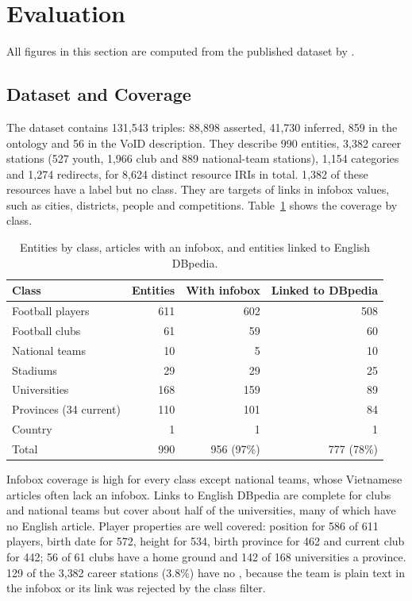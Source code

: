 \section{Evaluation}
\label{sec:evaluation}

All figures in this section are computed from the published dataset by
.

\subsection{Dataset and Coverage}
\label{sec:stats}

The dataset contains 131{,}543 triples: 88{,}898 asserted, 41{,}730 inferred,
859 in the ontology and 56 in the VoID description. They describe 990
entities, 3{,}382 career stations (527 youth, 1{,}966 club and 889
national-team stations), 1{,}154 categories and 1{,}274 redirects, for 8{,}624
distinct resource IRIs in total. 1{,}382 of these resources have a label but
no class. They are targets of links in infobox values, such as cities,
districts, people and competitions. Table~\ref{tab:coverage}
shows the coverage by class.

\begin{table}[t]
\centering
\caption{Entities by class, articles with an infobox, and entities linked to
English DBpedia.}
\label{tab:coverage}
\small
\begin{tabular}{@{}lrrr@{}}
\toprule
Class & Entities & With infobox & Linked to DBpedia \\
\midrule
Football players       & 611 & 602 & 508 \\
Football clubs         & 61  & 59  & 60 \\
National teams         & 10  & 5   & 10 \\
Stadiums               & 29  & 29  & 25 \\
Universities           & 168 & 159 & 89 \\
Provinces (34 current) & 110 & 101 & 84 \\
Country                & 1   & 1   & 1 \\
\midrule
Total                  & 990 & 956 (97\%) & 777 (78\%) \\
\bottomrule
\end{tabular}
\end{table}

Infobox coverage is high for every class except national teams, whose
Vietnamese articles often lack an infobox. Links to English DBpedia are
complete for clubs and national teams but cover about half of the
universities, many of which have no English article. Player properties are well
covered: position for 586 of 611 players, birth date for 572, height for 534,
birth province for 462 and current club for 442; 56 of 61 clubs have a home
ground and 142 of 168 universities a province. 129 of the 3{,}382 career
stations (3.8\%) have no , because the team is plain text in the
infobox or its link was rejected by the class filter.

